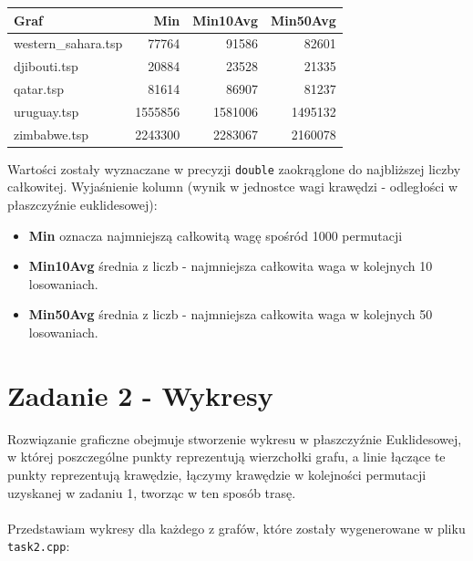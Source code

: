 \documentclass{article}
\begin{document}
\begin{longtable}{|l|rrr|}
\hline
\textbf{Graf} & \textbf{Min} & \textbf{Min10Avg} & \textbf{Min50Avg} \\ \hline
western\_sahara.tsp & 77764 & 91586 & 82601 \\ 
djibouti.tsp & 20884 & 23528 & 21335 \\ 
qatar.tsp & 81614 & 86907 & 81237 \\ 
uruguay.tsp & 1555856 & 1581006 & 1495132 \\
zimbabwe.tsp & 2243300 & 2283067 & 2160078 \\ \hline
\end{longtable}
\noindent
Wartości zostały wyznaczane w precyzji \texttt{double} zaokrąglone do najbliższej liczby całkowitej.
Wyjaśnienie kolumn (wynik w jednostce wagi krawędzi - odległości w płaszczyźnie euklidesowej):
\begin{itemize}
    \item \textbf{Min} oznacza najmniejszą całkowitą wagę spośród 1000 permutacji
    \item \textbf{Min10Avg} średnia z liczb - najmniejsza całkowita waga w kolejnych 10 losowaniach.
    \item \textbf{Min50Avg} średnia z liczb - najmniejsza całkowita waga w kolejnych 50 losowaniach. 
\end{itemize}

\section{Zadanie 2 - Wykresy}

Rozwiązanie graficzne obejmuje stworzenie wykresu w płaszczyźnie Euklidesowej, w której
poszczególne punkty reprezentują wierzchołki grafu, a linie łączące te punkty reprezentują krawędzie,
łączymy krawędzie w kolejności permutacji uzyskanej w zadaniu 1, tworząc w ten sposób trasę.\\\\

\noindent
Przedstawiam wykresy dla każdego z grafów, które zostały wygenerowane w pliku \texttt{task2.cpp}:
\end{document}
